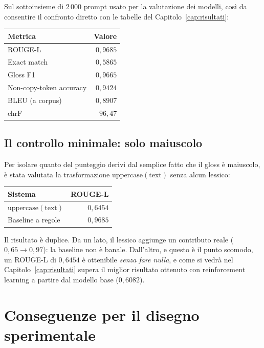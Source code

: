 Sul sottoinsieme di $2\,000$ prompt usato per la valutazione dei modelli, così
da consentire il confronto diretto con le tabelle del
Capitolo~\ref{cap:risultati}:

\begin{center}
\begin{tabular}{lr}
\toprule
Metrica & Valore \\
\midrule
ROUGE-L & $0{,}9685$ \\
Exact match & $0{,}5865$ \\
Gloss F1 & $0{,}9665$ \\
Non-copy-token accuracy & $0{,}9424$ \\
BLEU (a corpus) & $0{,}8907$ \\
chrF & $96{,}47$ \\
\bottomrule
\end{tabular}
\end{center}

\subsection{Il controllo minimale: solo maiuscolo}

Per isolare quanto del punteggio derivi dal semplice fatto che il gloss è
maiuscolo, è stata valutata la trasformazione $\mathrm{uppercase}(\text{text})$
senza alcun lessico:

\begin{center}
\begin{tabular}{lr}
\toprule
Sistema & ROUGE-L \\
\midrule
$\mathrm{uppercase}(\text{text})$ & $0{,}6454$ \\
Baseline a regole & $0{,}9685$ \\
\bottomrule
\end{tabular}
\end{center}

Il risultato è duplice. Da un lato, il lessico aggiunge un contributo reale
($0{,}65 \to 0{,}97$): la baseline non è banale. Dall'altro, e questo è il punto
scomodo, un ROUGE-L di $0{,}6454$ è ottenibile \emph{senza fare nulla}, e come si
vedrà nel Capitolo~\ref{cap:risultati} supera il miglior risultato ottenuto con
reinforcement learning a partire dal modello base ($0{,}6082$).

\section{Conseguenze per il disegno sperimentale}

